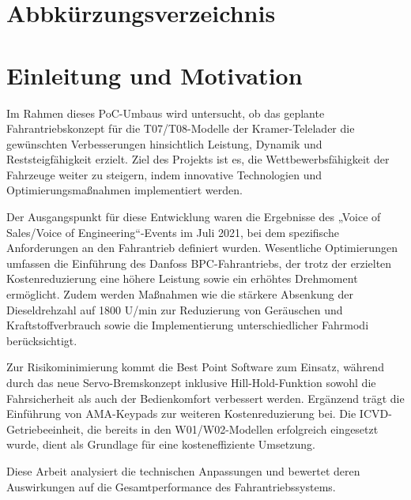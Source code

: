 \documentclass[a4paper, 12pt]{article} %
\begin{document}
\listoffigures

\clearpage

\section*{Abbkürzungsverzeichnis}
\begin{spacing}{1.8}  %
    \fontsize{14pt}{14pt}\selectfont  %

\begin{acronym}
\end{acronym}

\end{spacing}

\clearpage


\tableofcontents

\clearpage
{}


\section{Einleitung und Motivation}
\begin{spacing}{1.5}  %
\fontsize{14pt}{14pt}\selectfont  %
Im Rahmen dieses \ac{PoC}-Umbaus wird untersucht, ob das 
geplante Fahrantriebskonzept für die T07/T08-Modelle der Kramer-Telelader 
die gewünschten Verbesserungen hinsichtlich Leistung, Dynamik und 
Reststeigfähigkeit erzielt. Ziel des Projekts ist es, die Wettbewerbsfähigkeit
 der Fahrzeuge weiter zu steigern, indem innovative Technologien und 
 Optimierungsmaßnahmen implementiert werden.

Der Ausgangspunkt für diese Entwicklung waren die Ergebnisse des
 „Voice of Sales/Voice of Engineering“-Events im Juli 2021, bei dem 
 spezifische Anforderungen an den Fahrantrieb definiert wurden. 
 Wesentliche Optimierungen umfassen die Einführung des Danfoss 
 \ac{BPC}-Fahrantriebs, der trotz der erzielten Kostenreduzierung eine höhere 
 Leistung sowie ein erhöhtes Drehmoment ermöglicht. Zudem werden Maßnahmen 
 wie die stärkere Absenkung der Dieseldrehzahl auf 1800 U/min zur Reduzierung
  von Geräuschen und Kraftstoffverbrauch sowie die Implementierung 
  unterschiedlicher Fahrmodi berücksichtigt.

Zur Risikominimierung kommt die Best Point Software zum 
Einsatz, während durch das neue Servo-Bremskonzept inklusive 
Hill-Hold-Funktion sowohl die Fahrsicherheit als auch der Bedienkomfort 
verbessert werden. Ergänzend trägt die Einführung von AMA-Keypads zur weiteren 
Kostenreduzierung bei. Die ICVD-Getriebeeinheit, die bereits in 
den W01/W02-Modellen erfolgreich eingesetzt wurde, dient als Grundlage 
für eine kosteneffiziente Umsetzung.

Diese Arbeit analysiert die technischen 
Anpassungen und bewertet deren Auswirkungen auf die 
Gesamtperformance des Fahrantriebssystems.
\end{spacing}
\end{document}
